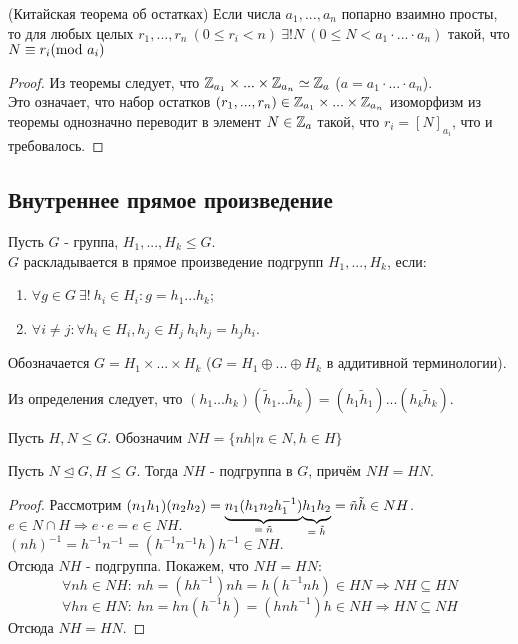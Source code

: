 \begin{consequense}(Китайская теорема об остатках)
    Если числа $a_1,...,a_n$ попарно взаимно просты, то для любых целых $r_1,...,r_n \ (0 \leq r_i < n) \ \exists ! N \ (0 \leq N < a_1\cdot...\cdot a_n)$ такой, что $N \equiv r_i (\textup{mod } a_i)$ 
\end{consequense}
\begin{proof}
    Из теоремы следует, что $\mathbb{Z}_{a_1}\times...\times \mathbb{Z}_{a_n}\simeq \mathbb{Z}_a$ ($a = a_1\cdot...\cdot a_n$).\\
    Это означает, что набор остатков $(r_1,...,r_n) \in \mathbb{Z}_{a_1}\times...\times \mathbb{Z}_{a_n}$ изоморфизм из теоремы однозначно переводит в элемент $N \in \mathbb{Z}_a$ такой, что $r_i = [N]_{a_i}$, что и требовалось.
\end{proof}
\subsection{Внутреннее прямое произведение}
\begin{definition}
    Пусть $G$ - группа, $H_1,...,H_k \leq G$.\\
    $G$ раскладывается в прямое произведение подгрупп $H_1,...,H_k$, если:
    \begin{enumerate}
        \item $\forall g \in G \ \exists! \ h_i \in H_i : g = h_1...h_k$;
        \item $\forall i \neq j: \forall h_i \in H_i, h_j \in H_j \ h_ih_j = h_jh_i$.
    \end{enumerate}
    Обозначается $G = H_1 \times ... \times H_k$ ($G = H_1 \oplus ... \oplus H_k$ в аддитивной терминологии).
\end{definition}
\begin{remark}
    Из определения следует, что $(h_1...h_k)(\tilde{h}_1...\tilde{h}_k) = (h_1\tilde{h}_1)...(h_k\tilde{h}_k)$. 
\end{remark}
\begin{definition}
    Пусть $H, N \leq G$. Обозначим $NH = \{nh | n \in N, h \in H\}$
\end{definition}
\begin{subtheorem}
    Пусть $N\unlhd G, H \leq G$. Тогда $NH$ - подгруппа в $G$, причём $NH = HN$.  
\end{subtheorem}
\begin{proof}
    Рассмотрим $(n_1h_1)(n_2h_2) = \undermat{= \tilde{n}}{n_1(h_1n_2h_1^{-1})}\undermat{= \tilde{h}}{h_1h_2} = \tilde{n}\tilde{h} \in NH$.\\
    $e \in N \cap H \Longrightarrow e \cdot e = e \in NH$.\\
    $(nh)^{-1} = h^{-1}n^{-1} = (h^{-1}n^{-1}h)h^{-1} \in NH$.\\
    Отсюда $NH$ - подгруппа. Покажем, что $NH = HN$:
    \[\forall nh \in NH:\ nh = (hh^{-1})nh = h(h^{-1}nh) \in HN \Longrightarrow NH \subseteq HN\]
    \[\forall hn \in HN:\ hn = hn(h^{-1}h) = (hnh^{-1})h  \in NH \Longrightarrow HN \subseteq NH\]
    Отсюда $NH = HN$.
\end{proof}
